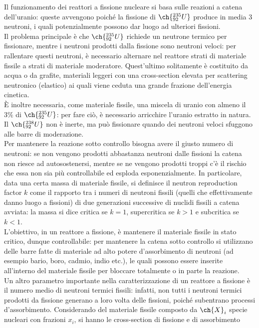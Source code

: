 Il funzionamento dei reattori a fissione nucleare si basa sulle reazioni a catena dell'uranio: queste avvengono poiché la fissione di $ \ch{^{235}_{92} U} $ produce in media 3 neutroni, i quali potenzialmente possono dar luogo ad ulteriori fissioni.\\
Il problema principale è che $ \ch{^{235}_{92} U} $ richiede un neutrone termico per fissionare, mentre i neutroni prodotti dalla fissione sono neutroni veloci: per rallentare questi neutroni, è necessario alternare nel reattore strati di materiale fissile a strati di materiale moderatore. Quest'ultimo solitamente è costituito da acqua o da grafite, materiali leggeri con una cross-section elevata per scattering neutronico (elastico) ai quali viene ceduta una grande frazione dell'energia cinetica.\\
È inoltre necessaria, come materiale fissile, una miscela di uranio con almeno il $ 3\% $ di $ \ch{^{235}_{92} U} $: per fare ciò, è necessario arricchire l'uranio estratto in natura. Il $ \ch{^{238}_{92} U} $ non è inerte, ma può fissionare quando dei neutroni veloci sfuggono alle barre di moderazione.\\
Per mantenere la reazione sotto controllo bisogna avere il giusto numero di neutroni: se non vengono prodotti abbastanza neutroni dalle fissioni la catena non riesce ad autosostenersi, mentre se ne vengono prodotti troppi c'è il rischio che essa non sia più controllabile ed esploda esponenzialmente. In particolare, data una certa massa di materiale fissile, si definisce il neutron reproduction factor $ k $ come il rapporto tra i numeri di neutroni fissili (quelli che effettivamente danno luogo a fissioni) di due generazioni successive di nuclidi fissili a catena avviata: la massa si dice critica se $ k = 1 $, supercritica se $ k > 1 $ e subcritica se $ k < 1 $.\\
L'obiettivo, in un reattore a fissione, è mantenere il materiale fissile in stato critico, dunque controllabile: per mantenere la catena sotto controllo si utilizzano delle barre fatte di materiale ad alto potere d'assorbimento di neutroni (ad esempio bario, boro, cadmio, indio etc.), le quali possono essere inserite all'interno del materiale fissile per bloccare totalmente o in parte la reazione.\\
Un altro parametro importante nella caratterizzazione di un reattore a fissione è il numero medio di neutroni termici fissili: infatti, non tutti i neutroni termici prodotti da fissione generano a loro volta delle fissioni, poiché subentrano processi d'assorbimento. Considerando del materiale fissile composto da $ \ch{X}_i $ specie nucleari con frazioni $ x_i $, si hanno le cross-section di fissione e di assorbimento
